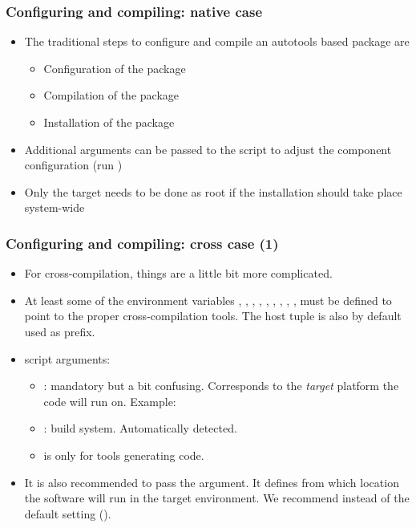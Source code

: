 \begin{frame}
  \frametitle{Configuring and compiling: native case}
  \begin{itemize}
  \item The traditional steps to configure and compile an autotools
    based package are
    \begin{itemize}
    \item Configuration of the package\\
    \item Compilation of the package\\
    \item Installation of the package\\
    \end{itemize}
  \item Additional arguments can be passed to the 
    script to adjust the component configuration
    (run )
  \item Only the  target needs to be done as root if the
    installation should take place system-wide
  \end{itemize}
\end{frame}

\begin{frame}
  \frametitle{Configuring and compiling: cross case (1)}
  \begin{itemize}
  \item For cross-compilation, things are a little bit more complicated.
  \item At least some of the environment variables ,
    , , , , ,
    , , ,  must be
    defined to point to the proper cross-compilation tools. The host
    tuple is also by default used as prefix.
  \item {} script arguments:
    \begin{itemize}
    \item {}: mandatory but a bit confusing.
     Corresponds to the {\em target} platform the code will run on.
     Example: 
    \item {}: build system. Automatically detected.
    \item {} is only for tools generating code.
    \end{itemize}
  \item It is also recommended to pass the  argument. It
    defines from which location the software will run in the target
    environment. We recommend  instead of the default
    setting ().
  \end{itemize}
\end{frame}


